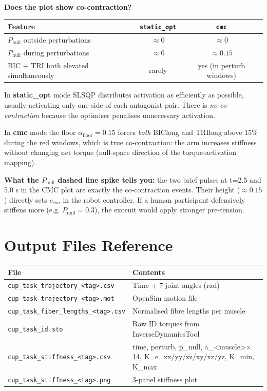 \documentclass[11pt,a4paper]{article}
\begin{document}
\textbf{Does the plot show co-contraction?}

\begin{center}
\begin{tabular}{lcc}
\toprule
Feature & \texttt{static\_opt} & \texttt{cmc} \\
\midrule
$P_\text{null}$ outside perturbations & $\approx 0$ & $\approx 0$ \\
$P_\text{null}$ during perturbations  & $\approx 0$ & $\approx 0.15$ \\
BIC + TRI both elevated simultaneously & rarely & yes (in perturb windows)\\
\bottomrule
\end{tabular}
\end{center}

In \textbf{static\_opt} mode SLSQP distributes activation as efficiently as
possible, usually activating only one side of each antagonist pair. There
is \emph{no co-contraction} because the optimiser penalises unnecessary
activation.

In \textbf{cmc} mode the floor $\alpha_\text{floor}=0.15$ forces
\emph{both} BIClong and TRIlong above 15\% during the red windows, which is
true co-contraction: the arm increases stiffness without changing net torque
(null-space direction of the torque-activation mapping).

\textbf{What the $P_\text{null}$ dashed line spike tells you:} the two
brief pulses at t=2.5 and 5.0 s in the CMC plot are exactly the
co-contraction events. Their height ($\approx0.15$) directly sets
$c_\text{exo}$ in the robot controller. If a human participant defensively
stiffens more (e.g. $P_\text{null}=0.3$), the exosuit would apply stronger
pre-tension.

\section{Output Files Reference}

\begin{center}
\begin{tabular}{p{7.5cm}p{7cm}}
\toprule
File & Contents \\
\midrule
\texttt{cup\_task\_trajectory\_<tag>.csv} & Time + 7 joint angles (rad) \\
\texttt{cup\_task\_trajectory\_<tag>.mot} & OpenSim motion file \\
\texttt{cup\_task\_fiber\_lengths\_<tag>.csv} & Normalised fibre lengths per muscle \\
\texttt{cup\_task\_id.sto} & Raw ID torques from InverseDynamicsTool \\
\texttt{cup\_task\_stiffness\_<tag>.csv} & time, perturb, p\_null, a\_<muscle>$\times$14,
  K\_e\_xx/yy/zz/xy/xz/yz, K\_min, K\_max \\
\texttt{cup\_task\_stiffness\_<tag>.png} & 3-panel stiffness plot \\
\bottomrule
\end{tabular}
\end{center}
\end{document}
